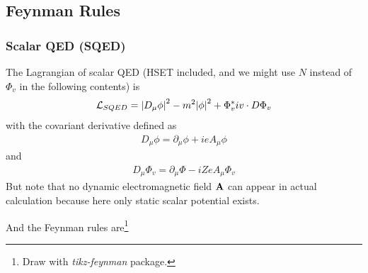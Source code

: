\documentclass[aps,prd,preprint,showkeys,10pt]{revtex4-1}
\newcommand{\lag}{\mathcal{L}}
\begin{document}
\subsection{Feynman Rules}
\subsubsection{Scalar QED (SQED)}
The Lagrangian of scalar QED (HSET included, and we might use $N$ instead of $\Phi_v$ in the following contents) is
\begin{align}
	\lag_{SQED}=\abs{D_{\mu}\phi}^2-m^2\abs{\phi}^2+\Phi_v^*iv\cdot D\Phi_v
	\label{SQEDLAG}
\end{align}
with the covariant derivative defined as
\begin{align*}
	D_{\mu}\phi=\partial_{\mu}\phi+ieA_{\mu}\phi
\end{align*}
and
\begin{align*}
	D_{\mu}\Phi_v=\partial_{\mu}\Phi-iZeA_{\mu}\Phi_v
\end{align*}
But note that no dynamic electromagnetic field $\vb{A}$ can appear in actual calculation because here only static scalar potential exists.

And the Feynman rules are\footnote{Draw with \emph{tikz-feynman} package\cite{Ellis2016}.}
\end{document}
